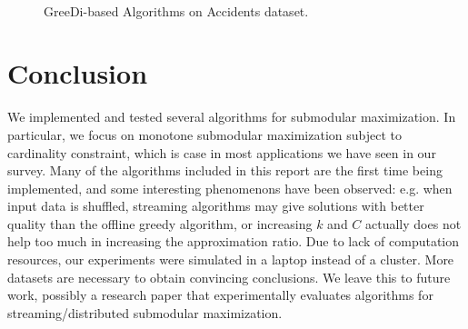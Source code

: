 \documentclass[11pt]{article}
\begin{document}
\begin{figure*}[h!]
     \centering
     ~~
     \caption{{\sc GreeDi}-based Algorithms on {\sc Accidents} dataset.}
     \label{fig:distributed-accidents}
\end{figure*}






\section{Conclusion}
\label{sec:conclude}
We implemented and tested several algorithms for submodular maximization. In particular, we focus on monotone submodular maximization subject to cardinality constraint, which is case in most applications we have seen in our survey. Many of the algorithms included in this report are the first time being implemented, and some interesting phenomenons have been observed: e.g. when input data is shuffled, streaming algorithms may give solutions with better quality than the offline greedy algorithm, or increasing $k$ and $C$ actually does not help too much in increasing the approximation ratio.  Due to lack of computation resources, our experiments were simulated in a laptop instead of a cluster. More datasets are necessary to obtain  convincing conclusions. We leave this to future work, possibly a research paper that experimentally evaluates algorithms for streaming/distributed submodular maximization.



















%
\end{document}
